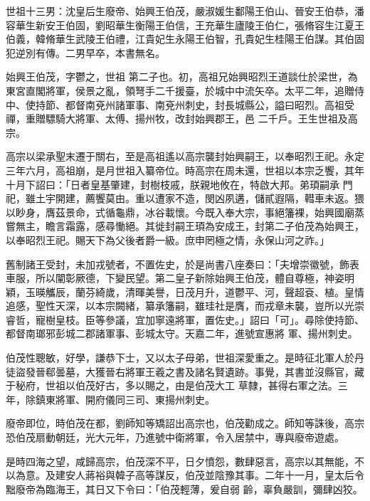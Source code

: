 
\begin{pinyinscope}

 世祖十三男：沈皇后生廢帝、始興王伯茂，嚴淑媛生鄱陽王伯山、晉安王伯恭，潘容華生新安王伯固，劉昭華生衡陽王伯信，王充華生廬陵王伯仁，張脩容生江夏王伯義，韓脩華生武陵王伯禮，江貴妃生永陽王伯智，孔貴妃生桂陽王伯謀。其伯固犯逆別有傳。二男早卒，本書無名。



 始興王伯茂，字鬱之，世祖
 第二子也。初，高祖兄始興昭烈王道談仕於梁世，為東宮直閣將軍，侯景之亂，領弩手二千援臺，於城中中流矢卒。太平二年，追贈侍中、使持節、都督南兗州諸軍事、南兗州刺史，封長城縣公，謚曰昭烈。高祖受禪，重贈驃騎大將軍、太傅、揚州牧，改封始興郡王，邑
 二千戶。王生世祖及高宗。



 高宗以梁承聖末遷于關右，至是高祖遙以高宗襲封始興嗣王，以奉昭烈王祀。永定三年六月，高祖崩，是月世祖入纂帝位。時高宗在周未還，世祖以本宗乏饗，其年十月下詔曰：「日者皇基肇建，封樹枝戚，朕親地攸在，特啟大邦。弟頊嗣承
 門祀，雖土宇開建，薦饗莫由。重以遭家不造，閔凶夙遘，儲貳遐隔，轊車未返。猥以眇身，膺茲景命，式循龜鼎，冰谷載懷。今既入奉大宗，事絕籓裸，始興國廟蒸嘗無主，瞻言霜露，感尋慟絕。其徙封嗣王頊為安成王，封第二子伯茂為始興王，以奉昭烈王祀。賜天下為父後者爵一級。庶申罔極之情，永保山河之祚。」



 舊制諸王受封，未加戎號者，不置佐史，於是尚書八座奏曰：「夫增崇徽號，飾表車服，所以闡彰厥德，下變民望。第二皇子新除始興王伯茂，體自尊極，神姿明穎，玉暎觿辰，蘭芬綺歲，清暉美譽，日茂月升，道鬱平、河，聲超袞、植。皇情追感，聖性天深，以本宗闕緒，纂承籓嗣，雖珪社是膺，而戎章未襲，豈所以光崇睿哲，寵樹皇枝。臣等參議，宜加寧遠將軍，置佐史。」詔曰「可」。尋除使持節、都督南瑯邪彭城二郡諸軍事、彭城太守。天嘉二年，進號宣惠將
 軍、揚州刺史。



 伯茂性聰敏，好學，謙恭下士，又以太子母弟，世祖深愛重之。是時征北軍人於丹徒盜發晉郗曇墓，大獲晉右將軍王羲之書及諸名賢遺跡。事覺，其書並沒縣官，藏于秘府，世祖以伯茂好古，多以賜之，由是伯茂大工
 草隸，甚得右軍之法。三年，除鎮東將軍、開府儀同三司、東揚州刺史。



 廢帝即位，時伯茂在都，劉師知等矯詔出高宗也，伯茂勸成之。師知等誅後，高宗恐伯茂扇動朝廷，光大元年，乃進號中衛將軍，令入居禁中，專與廢帝遊處。



 是時四海之望，咸歸高宗，伯茂深不平，日夕憤怨，數肆惡言，高宗以其無能，不以為意。及建安人蔣裕與韓子高等謀反，伯茂並陰豫其事。二年十一月，皇太后令黜廢帝為臨海王，其日又下令曰：「伯茂輕薄，爰自弱
 齡，辜負嚴訓，彌肆凶狡。




\end{pinyinscope}
